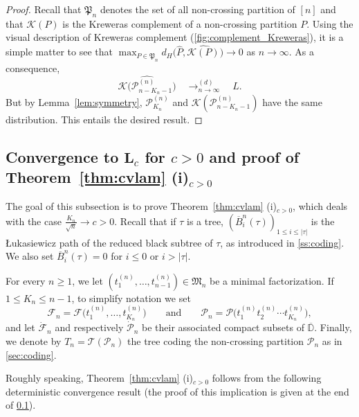 \documentclass[10pt]{amsart}
\theoremstyle{definition}\newtheorem{defi}[theo]{Definition}\newtheorem{rema}[theo]{Remark}\newtheorem{exam}[theo]{Example}\newtheorem{exem}[theo]{Example}\newtheorem{nota}[theo]{Notation}
\newcommand{\D}{\mathbb{D}}
\def\PPP{\mathcal P}
\def\FFF{\mathcal F}
\def\dFn{\dot{\mathcal{F}}_{n}}
\def\dPn{\dot{\mathcal{P}}_{n}}
\def\oB{\overline{B}}
\begin{document}
\begin{proof}
Recall that $ \mathfrak{P}_{n}$ denotes the set of all non-crossing partition of $[n]$ and that $\mathcal{K}(P)$ is the Kreweras complement of a non-crossing partition $P$.
Using the visual description of Kreweras complement (\cref{fig:complement_Kreweras}),
it is a simple matter to see that $ \max_{P \in \mathfrak{P}_{n}} d_{H} \big(\hat{P}, \widehat{\mathcal{K}(P)} \big) \rightarrow 0$ as $n \rightarrow \infty$.  As a consequence,
    \[ \widehat{\mathcal{K} \big(\PPP^{(n)}_{n-K_{n}-1}\big)}    \quad \mathop{\longrightarrow}^{(d)}_{n \rightarrow \infty} \quad  L.\]
But by Lemma~\ref{lem:symmetry}, $\PPP^{(n)}_{K_{n}}$ and $\mathcal{K}( \PPP^{(n)}_{n-K_{n}-1})$ have the same distribution. This entails the desired result.
\end{proof}



\subsection{Convergence to \texorpdfstring{$\mathbf{L}_{c}$}{Lc} for \texorpdfstring{$c >0$}{c > 0}
and proof of Theorem~\ref{thm:cvlam} (i)\texorpdfstring{$_{c>0}$}{c > 0}}
\label{ssec:cv_pos}
The goal of this subsection is to prove Theorem~\ref{thm:cvlam} (i)$_{c>0}$,
which deals with the case $\tfrac{K_{n}}{\sqrt{n}} \rightarrow c>0$.
Recall that if $\tau$ is a tree, $(\oB^{n}_{i}(\tau))_{1 \leq i \leq |\tau|}$ is the {\L}ukasiewicz path of the reduced black subtree of $\tau$, as introduced in \cref{ss:coding}. We also set $\oB^{n}_{i}(\tau)=0$ for $i \leq 0$ or $i>|\tau|$.

For every $n \geq 1$, we let $(t_{1}^{(n)}, \ldots, t_{n-1}^{(n)}) \in \mathfrak{M}_{n}$  be a minimal factorization. If $1 \leq K_{n} \leq n-1$, to simplify notation we set
\[  \FFF_{n}= \FFF \big( t_{1}^{(n)}, \ldots, t_{K_{n}}^{(n)}\big) \qquad \text{and} \qquad \PPP_{n}= \PPP\big(  t_{1}^{(n)}  t_{2}^{(n)}  \cdots t_{K_{n}}^{(n)}\big),\]
and let $\dFn$ and respectively  $\dPn$ be their associated compact subsets of $\overline{\D}$.
Finally, we denote by $T_{n}= \mathcal{T}( \PPP_{n})$   the tree coding the non-crossing partition  $\PPP_{n}$ as in \cref{sec:coding}.

Roughly speaking,  Theorem~\ref{thm:cvlam} (i)$_{c>0}$ follows from the following deterministic convergence result
(the proof of this implication is given at the end of \cref{ssec:cv_pos}).
\end{document}
